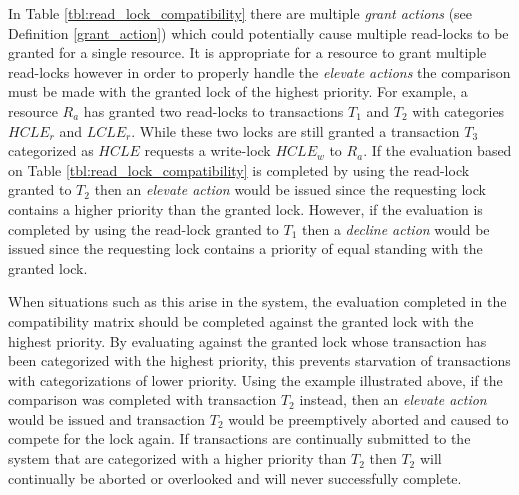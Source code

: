 \documentclass[conference]{IEEEtran}
\begin{document}
In Table \ref{tbl:read_lock_compatibility} there are multiple \textit{grant actions} (see Definition \ref{grant_action}) which could potentially cause multiple read-locks to be granted for a single resource. It is appropriate for a resource to grant multiple read-locks however in order to properly handle the \textit{elevate actions} the comparison must be made with the granted lock of the highest priority. For example, a resource $R_{a}$ has granted two read-locks to transactions $T_{1}$ and $T_{2}$ with categories $HCLE_{r}$ and $LCLE_{r}$. While these two locks are still granted a transaction $T_{3}$ categorized as $HCLE$ requests a write-lock $HCLE_{w}$ to $R_{a}$. If the evaluation based on Table \ref{tbl:read_lock_compatibility} is completed by using the read-lock granted to $T_{2}$ then an \textit{elevate action} would be issued since the requesting lock contains a higher priority than the granted lock. However, if the evaluation is completed by using the read-lock granted to $T_{1}$ then a \textit{decline action} would be issued since the requesting lock contains a priority of equal standing with the granted lock.

When situations such as this arise in the system, the evaluation completed in the compatibility matrix should be completed against the granted lock with the highest priority. By evaluating against the granted lock whose transaction has been categorized with the highest priority, this prevents starvation of transactions with categorizations of lower priority. Using the example illustrated above, if the comparison was completed with transaction $T_{2}$ instead, then an \textit{elevate action} would be issued and transaction $T_{2}$ would be preemptively aborted and caused to compete for the lock again. If transactions are continually submitted to the system that are categorized with a higher priority than $T_{2}$ then $T_{2}$ will continually be aborted or overlooked and will never successfully complete.
\end{document}
